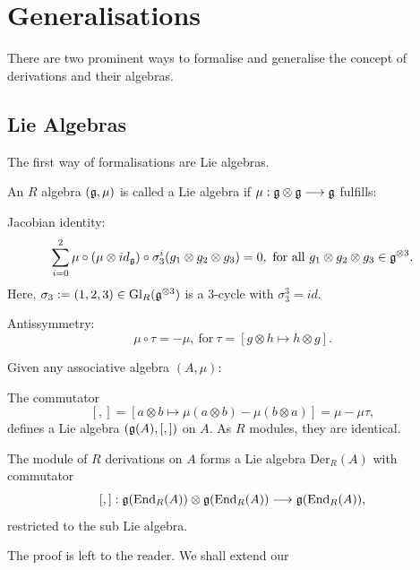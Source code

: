 
\section{Generalisations}
There are two prominent ways to formalise and generalise the concept of derivations and their algebras.
\subsection{Lie Algebras}
The first way of formalisations are Lie algebras. 
\begin{defi}

An $R$ algebra $(\mathfrak{g},\mu)$ is called a Lie algebra if $\mu : \mathfrak{g} \otimes \mathfrak{g} \longrightarrow \mathfrak{g}$ fulfills:
\bn
\item Jacobian identity:
$$\sum_{i=0}^2 \mu \circ (\mu \otimes id_{\mathfrak{g}}) \circ \sigma_3^i(g_1 \otimes g_2 \otimes g_3) = 0,\ \mathrm{for~all}\ g_1 \otimes g_2 \otimes g_3 \in \mathfrak{g}^{\otimes 3}.$$
Here, $\sigma_3 := (1,2,3) \in \mathrm{Gl}_R(\mathfrak{g}^{\otimes3})$ is a $3$-cycle with $\sigma_3^3 = id$.
\item Antissymmetry:
$$\mu \circ \tau = - \mu,\ \mathrm{for}\ \tau = [g \otimes h \longmapsto h \otimes g].$$
\en
\end{defi}
\begin{koro}
Given any associative algebra $(A,\mu)$:
\bn
\item The commutator
$$[,] = [a \otimes b \longmapsto \mu(a \otimes b) - \mu(b \otimes a)] = \mu - \mu \tau,$$
defines a Lie algebra $(\mathfrak{g}(A),[,])$ on $A$. As $R$ modules, they are identical.
\item The module of $R$ derivations on $A$ forms a Lie algebra $\mathrm{Der}_R(A)$ with commutator 
$$[,] : \mathfrak{g}(\mathrm{End}_R(A)) \otimes \mathfrak{g}(\mathrm{End}_R(A)) \longrightarrow \mathfrak{g}(\mathrm{End}_R(A)),$$
restricted to the sub Lie algebra.
\en
\end{koro}
\bmk The proof is left to the reader. We shall extend our
